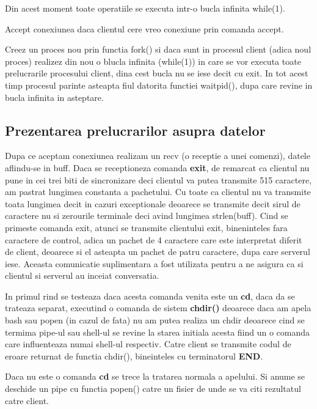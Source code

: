 Din acest moment toate operatiile se executa intr-o bucla infinita while(1).

Accept conexiunea daca clientul cere vreo conexiune prin comanda accept.

Creez un proces nou prin functia fork() si daca sunt in procesul client
(adica noul proces) realizez din nou o blucla infinita (while(1)) in care se
vor executa toate prelucrarile procesului client, dina cest bucla nu se iese
decit cu exit. In tot acest timp procesul parinte asteapta fiul datorita
functiei waitpid(), dupa care revine in bucla infinita in asteptare.

\subsection{Prezentarea prelucrarilor asupra datelor}

\hspace{5mm}Dupa ce aceptam conexiunea realizam un recv (o receptie a unei
comenzi), datele aflindu-se in buff. Daca se receptioneza comanda {\bf exit},
 de remarcat ca clientul nu pune in cei trei biti de sincronizare deci
clientul va putea transmite 515 caractere, am pastrat lungimea constanta a
pachetului. Cu toate ca clientul nu va transmite toata lungimea decit in
cazuri exceptionale deoarece se transmite decit sirul de caractere nu si
zerourile terminale deci avind lungimea strlen(buff). Cind se primeste
comanda exit, atunci se transmite clientului exit, bineninteles fara
caractere de control, adica un pachet de 4 caractere care este interpretat
diferit de client, deoarece si el asteapta un pachet de patru caractere,
dupa care serverul iese. Aceasta comunicatie suplimentara a fost utilizata
pentru a ne asigura ca si clientul si serverul au inceiat conversatia.

In primul rind se testeaza daca acesta comanda venita este un {\bf cd}, daca
da se trateaza separat, executind o comanda de sistem {\bf chdir()} deoarece daca am apela
bash sau popen (in cazul de fata) nu am putea realiza un chdir deoarece cind
se termima pipe-ul sau shell-ul se revine la starea initiala acesta fiind un
o comanda care influenteaza numai shell-ul respectiv. Catre client se transmite codul de
eroare returnat de functia chdir(), bineinteles cu terminatorul {\bf END}.

Daca nu este o comanda {\bf cd} se trece la tratarea normala a apelului. Si
anume se deschide un pipe cu functia popen() catre un fisier de unde se va
citi rezultatul catre client.

